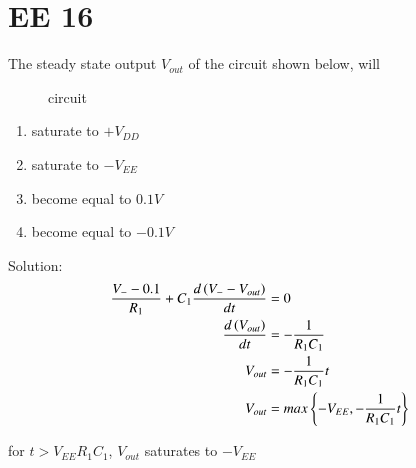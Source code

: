\documentclass[journal,12pt,twocolumn]{IEEEtran}
\begin{document}


\vspace{3cm}

\title{}
\author{EE23BTECH11217 - Prajwal M$^{*}$
}
\maketitle
\newpage
\bigskip

\renewcommand{\thefigure}{\theenumi}
\renewcommand{\thetable}{\theenumi}

\section*{EE 16}
The steady state output $V_{out}$ of the circuit shown below, will
\begin{figure}[h]
    \centering
    
    \caption{circuit}
    \label{fig: 217.EE.16.1}
\end{figure}

\begin{enumerate}
    \item saturate to $+V_{DD}$
    \item saturate to $-V_{EE}$
    \item become equal to $0.1V$
    \item become equal to $-0.1V$
\end{enumerate}

\noindent Solution: \\

%     

\begin{align}
    \frac{V_{-} - 0.1}{R_1} + C_1\frac{d \left(V_{-} - V_{out}\right)}{dt} & = 0\\
    \frac{d \left(V_{out}\right)}{dt} & = -\frac{1}{R_1C_1}\\
    V_{out} & = -\frac{1}{R_1C_1}t\\
    V_{out} & = max\left\{-V_{EE}, -\frac{1}{R_1C_1}t\right\}\\
\end{align}

for $t>V_{EE}R_1C_1$, $V_{out}$ saturates to $-V_{EE}$
\end{document}
